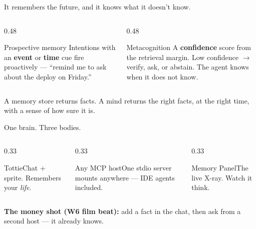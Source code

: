 \documentclass[aspectratio=169,10pt]{beamer}
\begin{document}
\begin{frame}{It remembers the future, and it knows what it doesn't know.}
  \begin{columns}
    \begin{column}{0.48\textwidth}
      \begin{block}{Prospective memory}
        Intentions with an \textbf{event} or \textbf{time} cue fire proactively --- ``remind me to ask
        about the deploy on Friday.''
      \end{block}
    \end{column}
    \begin{column}{0.48\textwidth}
      \begin{block}{Metacognition}
        A \textbf{confidence} score from the retrieval margin. Low confidence $\rightarrow$ verify, ask,
        or abstain. The agent knows when it does not know.
      \end{block}
    \end{column}
  \end{columns}
  \vfill
  \centering A memory store returns facts. A mind returns the right facts, at the right time, with a
  sense of how sure it is.
\end{frame}

\begin{frame}{One brain. Three bodies.}
  \begin{columns}
    \begin{column}{0.33\textwidth}\begin{block}{Tottie}Chat + sprite. Remembers your \emph{life}.\end{block}\end{column}
    \begin{column}{0.33\textwidth}\begin{block}{Any MCP host}One stdio server mounts anywhere --- IDE agents included.\end{block}\end{column}
    \begin{column}{0.33\textwidth}\begin{block}{Memory Panel}The live X-ray. Watch it think.\end{block}\end{column}
  \end{columns}
  \vfill
  \centering \textbf{The money shot (W6 film beat):} add a fact in the chat, then ask from a second
  host --- it already knows.
\end{frame}
\end{document}
